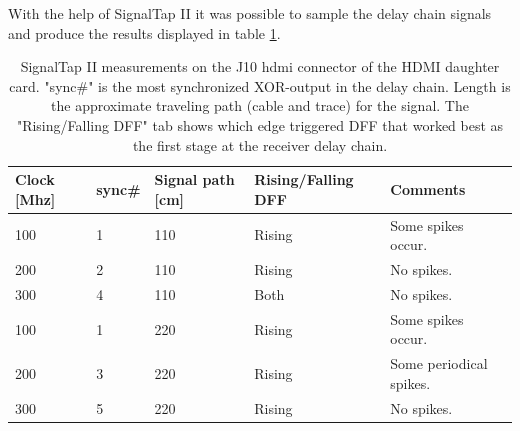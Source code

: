 \documentclass[main.tex]{subfiles}
\begin{document}
With the help of SignalTap II it was possible to sample the delay chain signals and produce the results displayed in table \ref{tab:delch}. 
\begin{table}
\centering
\caption{SignalTap II measurements on the J10 hdmi connector of the HDMI daughter card. "sync\#" is the most synchronized XOR-output in the delay chain. Length is the approximate traveling path (cable and trace) for the signal. The "Rising/Falling DFF" tab shows which edge triggered DFF that worked best as the first stage at the receiver delay chain.}
\label{tab:delch}
\begin{tabular}{|p{1cm}|p{1.5cm}|p{2cm}|p{2.5cm}|p{5cm}|}
\hline
 Clock [Mhz]  & sync\#   & Signal path [cm]   & Rising/Falling DFF  & Comments \\ \hline
 100          & 1     & 110           & Rising              & Some spikes occur.  \\ \hline
 200          & 2     & 110           & Rising              & No spikes. \\ \hline
 300          & 4     & 110           & Both                & No spikes. \\ \hline
 100          & 1     & 220           & Rising              & Some spikes occur.\\ \hline
 200          & 3     & 220           & Rising              & Some periodical spikes.\\ \hline
 300          & 5     & 220           & Rising              & No spikes.\\ \hline
\end{tabular}
\end{table}


\end{document}
